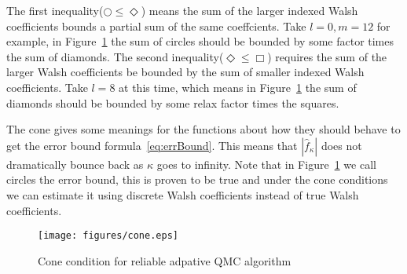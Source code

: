 The first inequality($\bigcirc \leq \Diamond$) means the sum of the larger indexed Walsh coefficients bounds a partial sum of the same coeffcients. 
Take $l=0, m=12$ for example, in Figure~\ref{fg:cone} the sum of circles should be bounded by some factor times the sum of diamonds. The second inequality($\Diamond\leq \Box$) requires the sum of the larger Walsh coefficients be bounded by the sum of smaller indexed Walsh coefficients. 
Take $l=8$ at this time, which means in Figure~\ref{fg:cone} the sum of diamonds should be bounded by some relax factor times the squares.

The cone gives some meanings for the functions about how they should behave to get the error bound formula~\eqref{eq:errBound}. 
This means that $|\hat{f}_\kappa|$ does not dramatically bounce back as $\kappa$ goes to infinity. 
Note that in Figure~\ref{fg:cone} we call circles the error bound, this is proven to be true and under the cone conditions we can estimate it using discrete Walsh coefficients instead of true Walsh coefficients.
\begin{figure}[h]
    \centering
    \texttt{[image: figures/cone.eps]}
    \caption{Cone condition for reliable adpative QMC algorithm}
    \label{fg:cone}
\end{figure}
